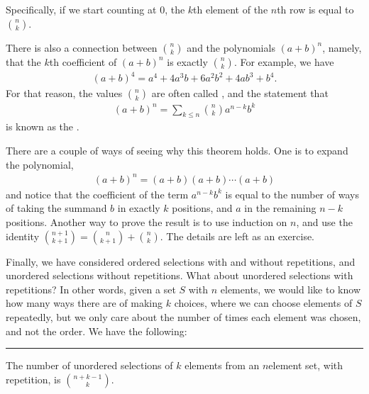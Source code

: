 \documentclass[letterpaper,10pt,english]{sphinxmanual}
\begin{document}
\sphinxAtStartPar
Specifically, if we start counting at \(0\), the \(k\)th element of the \(n\)th row is equal to \(\binom{n}{k}\).

\sphinxAtStartPar
There is also a connection between \(\binom{n}{k}\) and the polynomials \((a + b)^n\), namely, that the \(k\)th coefficient of \((a + b)^n\) is exactly \(\binom{n}{k}\). For example, we have
\begin{equation*}
\begin{split}(a + b)^4 = a^4 + 4 a^3 b + 6 a^2 b^2 + 4 a b^3 + b^4.\end{split}
\end{equation*}
\sphinxAtStartPar
For that reason, the values \(\binom{n}{k}\) are often called , and the statement that
\begin{equation*}
\begin{split}(a + b)^n = \sum_{k \le n} \binom{n}{k} a^{n-k} b^k\end{split}
\end{equation*}
\sphinxAtStartPar
is known as the .

\sphinxAtStartPar
There are a couple of ways of seeing why this theorem holds. One is to expand the polynomial,
\begin{equation*}
\begin{split}(a + b)^n = (a + b) (a + b) \cdots (a + b)\end{split}
\end{equation*}
\sphinxAtStartPar
and notice that the coefficient of the term \(a^{n-k} b^k\) is equal to the number of ways of taking the summand \(b\) in exactly \(k\) positions, and \(a\) in the remaining \(n - k\) positions. Another way to prove the result is to use induction on \(n\), and use the identity \(\binom{n+1}{k+1} = \binom{n}{k+1} + \binom{n}{k}\). The details are left as an exercise.

\sphinxAtStartPar
Finally, we have considered ordered selections with and without repetitions, and unordered selections without repetitions. What about unordered selections with repetitions? In other words, given a set \(S\) with \(n\) elements, we would like to know how many ways there are of making \(k\) choices, where we can choose elements of \(S\) repeatedly, but we only care about the number of times each element was chosen, and not the order. We have the following:


\bigskip\hrule\bigskip


\sphinxAtStartPar
The number of unordered selections of \(k\) elements from an \(n\)\sphinxhyphen{}element set, with repetition, is \(\binom{n + k - 1}{k}\).
\end{document}
